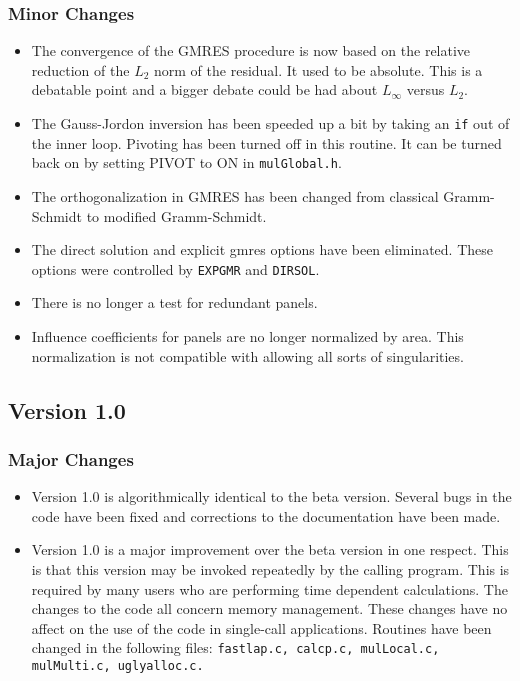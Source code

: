 \subsubsection{Minor Changes}
\begin{itemize}
\item{The convergence of the GMRES procedure is now based on the relative 
reduction of the $L_2$ norm of the residual.  It used to be absolute.  
This is a debatable point and a bigger debate could be had about 
$L_\infty$ versus  $L_2$.}

\item{The Gauss-Jordon inversion has been speeded up a bit by taking
an {\tt if} out of the inner loop.  Pivoting has been turned off in 
this routine.  It can be turned back on by setting PIVOT to ON
in {\tt mulGlobal.h}.}

\item{The orthogonalization in GMRES has been changed from classical
Gramm-Schmidt to modified Gramm-Schmidt.}

\item{The direct solution and explicit gmres options have been 
eliminated.  These options were controlled by {\tt EXPGMR} and 
{\tt DIRSOL}.}

\item{There is no longer a test for redundant panels.}

\item{Influence coefficients for panels are no longer normalized by area.  This
normalization is not compatible with allowing all sorts of singularities. }
\end{itemize}

\subsection{Version 1.0}
\label{ss:release10}
\subsubsection{Major Changes}
\begin{itemize}
\item{Version 1.0 is algorithmically identical to the beta version.  Several bugs 
in the code have been fixed and corrections to the documentation have been 
made.} 

\item{Version 1.0 is a major improvement over the beta version in one respect.  
This is that this version may be invoked repeatedly by the calling program.
This is required by many users who are performing time dependent calculations.
The changes to the code all concern memory management. These changes have
no affect on the use of the code in single-call applications.  Routines have
been changed in the following files: {\tt fastlap.c, calcp.c, mulLocal.c,
mulMulti.c, uglyalloc.c.}}
\end{itemize}

